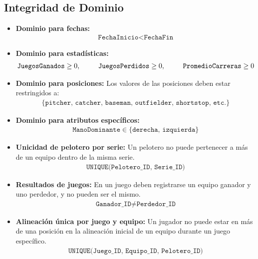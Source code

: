 \documentclass{report}
\begin{document}
    \subsection*{Integridad de Dominio}
    \begin{itemize}
        \item \textbf{Dominio para fechas:} 
        \begin{align*}
            \texttt{FechaInicio} < \texttt{FechaFin}
        \end{align*}

        \item \textbf{Dominio para estadísticas:} 
        \begin{align*}
            \texttt{JuegosGanados} \geq 0, \hspace*{0.9cm} \texttt{JuegosPerdidos} \geq 0, \hspace*{0.9cm} \texttt{PromedioCarreras} \geq 0
        \end{align*}

        \item \textbf{Dominio para posiciones:} Los valores de las posiciones deben estar restringidos a:
        \begin{align*}
            \{\texttt{pitcher, catcher, baseman, outfielder, shortstop, etc.}\}
        \end{align*}

        \item \textbf{Dominio para atributos específicos:} 
        \begin{align*}
            \texttt{ManoDominante} \in \{\texttt{derecha, izquierda}\}
        \end{align*}

        \item \textbf{Unicidad de pelotero por serie:} Un pelotero no puede pertenecer a más de un equipo dentro de 
        la misma serie.
        \begin{align*}
            \texttt{UNIQUE(Pelotero\_ID, Serie\_ID)}
        \end{align*}

        \item \textbf{Resultados de juegos:} En un juego deben registrarse un equipo ganador y uno perdedor, y no 
        pueden ser el mismo.
        \begin{align*}
            \texttt{Ganador\_ID} \neq \texttt{Perdedor\_ID}
        \end{align*}

        \item \textbf{Alineación única por juego y equipo:} Un jugador no puede estar en más de una posición en la 
        alineación inicial de un equipo durante un juego específico.
        \begin{align*}
            \texttt{UNIQUE(Juego\_ID, Equipo\_ID, Pelotero\_ID)}
        \end{align*}


\end{itemize}
\end{document}
